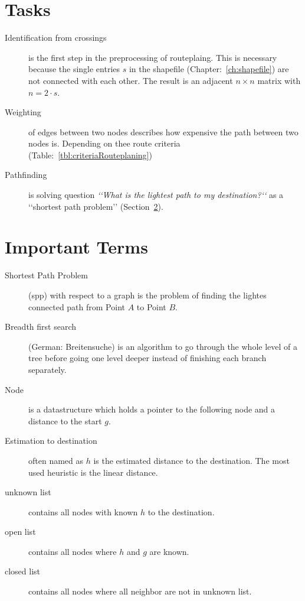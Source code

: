 \section{Tasks}
\label{sec:tasks}
\begin{description}
    \item[Identification from crossings] is the first step in the preprocessing of routeplaing.
    This is necessary because the single entries $s$ in the shapefile (Chapter:~\ref{ch:shapefile}) are not connected with each other.
    The result is an adjacent $n \times n$ matrix with $n = 2 \cdot s$.
    \item[Weighting] of edges between two nodes describes how expensive the path between two nodes is.
    Depending on thee route criteria (Table:~\ref{tbl:criteriaRouteplaning})
    \item[Pathfinding] is solving question \textit{\lq\lq{What is the lightest path to my destination?}\lq\lq{}} as a \lq\lq{}shortest path problem\rq\rq{} (Section~\ref{sec:important-terms}).
\end{description}

\section{Important Terms}
\label{sec:important-terms}
\begin{description}
    \item[Shortest Path Problem] (spp) with respect to a graph is the problem of finding the lightes connected path from Point $A$ to Point $B$.
    \item[Breadth first search] (German: Breitensuche) is an algorithm to go through the whole level of a tree before going one level deeper instead of finishing each branch separately.
    \item[Node] is a datastructure which holds a pointer to the following node and a distance to the start $g$.
    \item[Estimation to destination] often named as $h$ is the estimated distance to the destination.
    The most used heuristic is the linear distance.
    \item[unknown list] contains all nodes with known $h$ to the destination.
    \item[open list] contains all nodes where $h$ and $g$ are known.
    \item[closed list] contains all nodes where all neighbor are not in unknown list.
\end{description}

